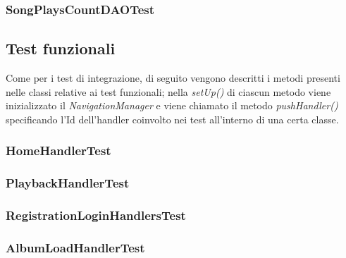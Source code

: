 \documentclass{article}
\begin{document}
  \subsubsection{SongPlaysCountDAOTest}

  \subsection{Test funzionali}
  Come per i test di integrazione, di seguito vengono descritti i metodi presenti nelle classi relative ai test funzionali; nella \textit{setUp()} di ciascun metodo viene inizializzato il \textit{NavigationManager} e viene chiamato il metodo \textit{pushHandler()} specificando l'Id dell'handler coinvolto nei test all'interno di una certa classe.

  \subsubsection{HomeHandlerTest}

  \subsubsection{PlaybackHandlerTest}

  \subsubsection{RegistrationLoginHandlersTest}

  \subsubsection{AlbumLoadHandlerTest}
\end{document}
